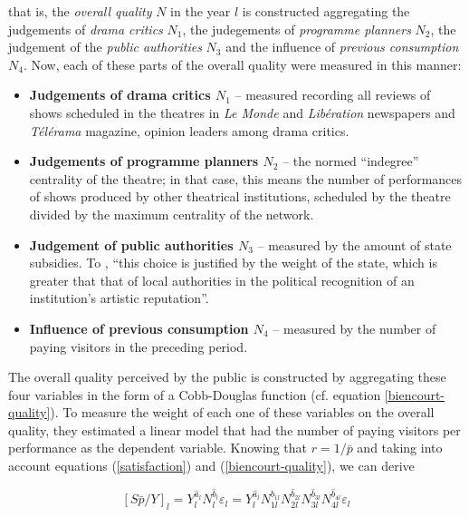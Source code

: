 \documentclass[a4paper, 12pt, openright, oneside, german, french, brazil, english, article]{abntex2}
\begin{document}
	that is, the \textit{overall quality} $N$ in the year $l$ is constructed aggregating the judgements of \textit{drama critics} $N_1$, the judegements of \textit{programme planners} $N_2$, the judgement of the \textit{public authorities} $N_3$ and the influence of \textit{previous consumption} $N_4$. Now, each of these parts of the overall quality were measured in this manner:
	
	
	\begin{itemize}
		\item \textbf{Judgements of drama critics $N_1$} -- measured recording all reviews of shows scheduled in the theatres in \textit{Le Monde} and \textit{Libération} newspapers and \textit{Télérama} magazine, opinion leaders among drama critics.
		
		\item \textbf{Judgements of programme planners $N_2$} -- the normed ``indegree'' centrality of the theatre; in that case, this means the number of performances of shows produced by other theatrical institutions, scheduled by the theatre divided by the maximum centrality of the network.
		
		\item \textbf{Judgement of public authorities $N_3$} -- measured by the amount of state subsidies. To , ``this choice is justified by the weight of the state, which is greater that that of local authorities in the political recognition of an institution's artistic reputation''.
		
		\item \textbf{Influence of previous consumption $N_4$} -- measured by the number of paying visitors in the preceding period.
	\end{itemize}
	
	The overall quality perceived by the public is constructed by aggregating these four variables in the form of a Cobb-Douglas function (cf. equation \ref{biencourt-quality}). To measure the weight of each one of these variables on the overall quality, they estimated a linear model that had the number of paying visitors per performance as the dependent variable. Knowing that $r = 1/\bar{p}$ and taking into account equations (\ref{satisfaction}) and (\ref{biencourt-quality}), we can derive
	
	\begin{equation}
	\label{biencourt-derivation}
		[S\bar{p}/Y]_l = Y_{l}^{\hat{a}_l} N_{l}^{\hat{b}_l} \varepsilon_l = Y_{l}^{\hat{a}_l} N_{1l}^{\hat{b}_{1l}} N_{2l}^{\hat{b}_{2l}} N_{3l}^{\hat{b}_{3l}} N_{4l}^{\hat{b}_{4l}} \varepsilon_l
	\end{equation}
	
\end{document}
